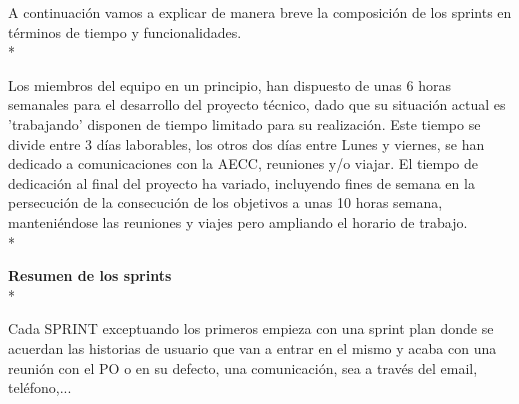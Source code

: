 \documentclass[../pfc.tex]{subfiles}
\begin{document}
	A continuación vamos a explicar de manera breve la composición de los sprints en términos de tiempo y funcionalidades.\\*
	
	Los miembros del equipo en  un principio, han dispuesto de unas 6 horas semanales para el desarrollo del proyecto técnico, dado que su situación actual es 'trabajando' disponen de tiempo limitado para su realización. Este tiempo se divide entre 3 días laborables, los otros dos días entre Lunes y viernes, se han dedicado a comunicaciones con la AECC, reuniones y/o viajar.	
	El tiempo de dedicación al final del proyecto ha variado, incluyendo fines de semana en la persecución de la consecución de los objetivos a unas 10 horas semana, manteniéndose las reuniones y viajes pero ampliando el horario de trabajo.\\*
	 
	\textbf{Resumen de los sprints}\\*
	
	Cada SPRINT exceptuando los primeros empieza con una sprint plan donde se acuerdan las historias de usuario que van a entrar en el mismo y acaba con una reunión con el PO o en su defecto, una comunicación, sea a través del email, teléfono,...
	
\end{document}
